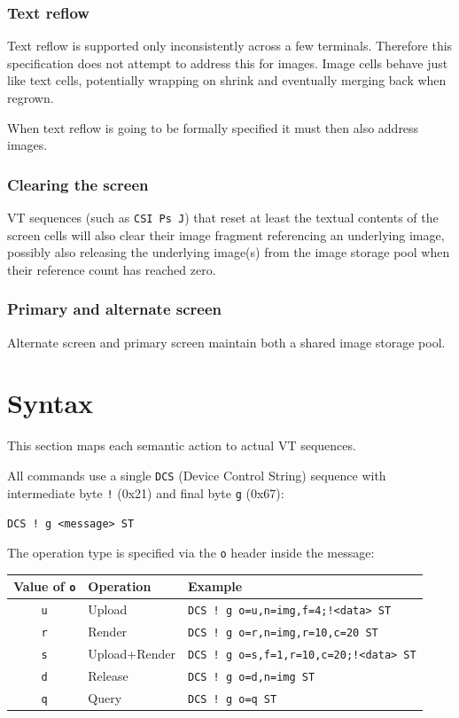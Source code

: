 \documentclass[a4paper]{article}
\newcommand{\code}[1]{\colorbox{light-gray}{\texttt{#1}}}
\begin{document}
\subsubsection*{Text reflow}

Text reflow is supported only inconsistently across a few terminals.
Therefore this specification does not attempt to address this for images.
Image cells behave just like text cells, potentially wrapping on shrink
and eventually merging back when regrown.

When text reflow is going to be formally specified it must then also address images.

\subsubsection*{Clearing the screen}

VT sequences (such as \code{CSI Ps J}) that reset at least the textual contents
of the screen cells will also clear their image fragment referencing an underlying image,
possibly also releasing the underlying image(s) from the image storage pool
when their reference count has reached zero.

\subsubsection*{Primary and alternate screen}

Alternate screen and primary screen maintain both a shared image storage pool.


\section{Syntax} %

This section maps each semantic action to actual VT sequences.

All commands use a single \code{DCS} (Device Control String) sequence
with intermediate byte \code{!} (0x21) and final byte \code{g} (0x67):

\begin{center}
    \code{DCS ! g <message> ST}
\end{center}

The operation type is specified via the \code{o} header inside the message:

\begin{tabular}{ |c|l|l| }
    \hline
    \textbf{Value of \code{o}} & \textbf{Operation} & \textbf{Example} \\
    \hline
    \code{u} & Upload          & \code{DCS ! g o=u,n=img,f=4;!<data> ST} \\
    \code{r} & Render          & \code{DCS ! g o=r,n=img,r=10,c=20 ST} \\
    \code{s} & Upload+Render   & \code{DCS ! g o=s,f=1,r=10,c=20;!<data> ST} \\
    \code{d} & Release         & \code{DCS ! g o=d,n=img ST} \\
    \code{q} & Query           & \code{DCS ! g o=q ST} \\
    \hline
\end{tabular}
\end{document}
